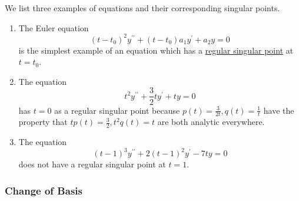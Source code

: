 \documentclass{article}
\newcounter{example}[section]
\begin{document}
    \begin{example}
      \label{ex:singular-points-of-standard-equations}
    We list three examples of equations and their corresponding singular points. 
    \begin{enumerate}
        \item The Euler equation 
        \begin{equation}
          (t - t_0)^2 y^{\prime\prime} + (t - t_0) a_1 y^\prime + a_2 y = 0
        \end{equation}
        is the simplest example of an equation which has a \hyperref[def:regular-singular-point]{regular singular point} at $t = t_0$. 
        \item The equation 
        \begin{equation}
          t^2 y^{\prime\prime} + \frac{3}{2} t y^\prime + ty = 0
        \end{equation}
        has $t = 0$ as a regular singular point because $p(t) = \frac{3}{2t}, q(t) = \frac{1}{t}$ have the property that $t p(t) = \frac{3}{2}, t^2 q(t) = t$ are both analytic everywhere.
        \item The equation 
        \begin{equation}
          (t-1)^3 y^{\prime\prime} + 2(t-1)^2 y^\prime - 7ty = 0
        \end{equation}
        does not have a regular singular point at $t = 1$. 
    \end{enumerate}
    \end{example}

    \subsubsection{Change of Basis}
\end{document}
